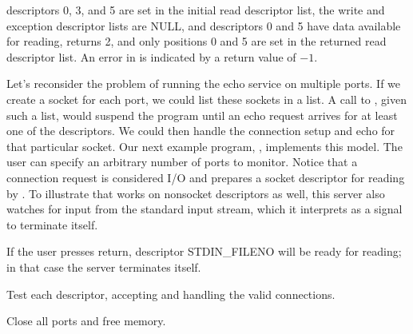 descriptors 0, 3, and 5 are set in the initial read descriptor list,
the write and exception descriptor lists are NULL, and descriptors 0
and 5 have data available for reading,  returns
2, and only positions 0 and 5 are set in the returned read descriptor
list.  An error in  is indicated by a return value of
$-1$.

Let's reconsider the problem of
running the echo service on multiple ports.  If we create a socket for each
port, we could list these sockets in a  list.
A call to , given such a list, would suspend
the program
until an echo request arrives for at least one of the descriptors.  We
could then handle the connection setup and echo for that particular
socket.  Our next example program, , implements 
this model.  The user can specify an arbitrary number of ports to monitor.
Notice that a connection request is considered I/O and prepares a
socket descriptor for reading by .
To illustrate that  works on nonsocket
descriptors
as well, this server also watches for input from the standard input
stream, which it interprets as a signal to terminate itself.


\begin{topcode}




\begin{bottomcode}



If the user presses return, descriptor STDIN\_FILENO
will be ready for reading; in
that case the server terminates itself.


Test each descriptor, accepting and handling the valid connections.

\end{bottomcode}


Close all ports and free memory.

\end{topcode}

